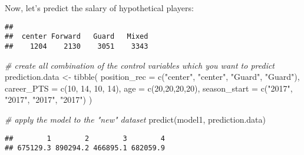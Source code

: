 \documentclass[
]{book}
\newenvironment{Shaded}{\begin{snugshade}}{\end{snugshade}}
\newcommand{\AttributeTok}[1]{\textcolor[rgb]{0.77,0.63,0.00}{#1}}
\newcommand{\CommentTok}[1]{\textcolor[rgb]{0.56,0.35,0.01}{\textit{#1}}}
\newcommand{\DecValTok}[1]{\textcolor[rgb]{0.00,0.00,0.81}{#1}}
\newcommand{\FunctionTok}[1]{\textcolor[rgb]{0.00,0.00,0.00}{#1}}
\newcommand{\NormalTok}[1]{#1}
\newcommand{\OtherTok}[1]{\textcolor[rgb]{0.56,0.35,0.01}{#1}}
\newcommand{\SpecialCharTok}[1]{\textcolor[rgb]{0.00,0.00,0.00}{#1}}
\newcommand{\StringTok}[1]{\textcolor[rgb]{0.31,0.60,0.02}{#1}}
\begin{document}
Now, let's predict the salary of hypothetical players:

\begin{Shaded}
\end{Shaded}

\begin{verbatim}
## 
##  center Forward   Guard   Mixed 
##    1204    2130    3051    3343
\end{verbatim}

\begin{Shaded}
\begin{Highlighting}[]
\CommentTok{\# create all combination of the control variables which you want to predict}
\NormalTok{prediction.data }\OtherTok{\textless{}{-}} \FunctionTok{tibble}\NormalTok{(}
  \AttributeTok{position\_rec =} \FunctionTok{c}\NormalTok{(}\StringTok{"center"}\NormalTok{, }\StringTok{"center"}\NormalTok{, }\StringTok{"Guard"}\NormalTok{, }\StringTok{"Guard"}\NormalTok{),}
  \AttributeTok{career\_PTS =} \FunctionTok{c}\NormalTok{(}\DecValTok{10}\NormalTok{, }\DecValTok{14}\NormalTok{, }\DecValTok{10}\NormalTok{, }\DecValTok{14}\NormalTok{),}
  \AttributeTok{age =} \FunctionTok{c}\NormalTok{(}\DecValTok{20}\NormalTok{,}\DecValTok{20}\NormalTok{,}\DecValTok{20}\NormalTok{,}\DecValTok{20}\NormalTok{),}
  \AttributeTok{season\_start =} \FunctionTok{c}\NormalTok{(}\StringTok{"2017"}\NormalTok{, }\StringTok{"2017"}\NormalTok{, }\StringTok{"2017"}\NormalTok{, }\StringTok{"2017"}\NormalTok{)}
\NormalTok{)}

\CommentTok{\# apply the model to the "new" dataset}
\FunctionTok{predict}\NormalTok{(model1, }
\NormalTok{        prediction.data)}
\end{Highlighting}
\end{Shaded}

\begin{verbatim}
##        1        2        3        4 
## 675129.3 890294.2 466895.1 682059.9
\end{verbatim}

\begin{Shaded}
\end{Shaded}
\end{document}
